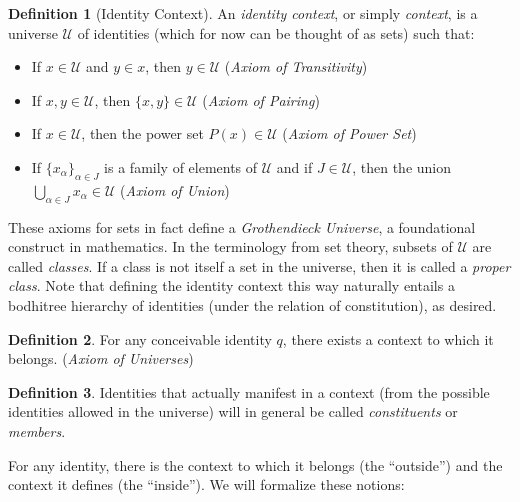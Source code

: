 \documentclass[pra,twocolumn,groupedaddress,10pt]{revtex4}
\theoremstyle{definition}
\newtheorem{defn}{Definition}[section]
\begin{document}
\begin{defn}[Identity Context]
	An \emph{identity context}, or simply \emph{context}, is a universe $\mathscr{U}$ of identities (which for now can be thought of as sets) such that:
	\begin{itemize}
		\item If $x \in \mathscr{U}$ and $y \in x$, then $y \in \mathscr{U}$ (\emph{Axiom of Transitivity})
		\item If $x, y \in \mathscr{U}$, then $\{x,y\} \in \mathscr{U}$ (\emph{Axiom of Pairing})
		\item If $x \in \mathscr{U}$, then the power set $P(x) \in \mathscr{U}$ (\emph{Axiom of Power Set})
		\item If $\{x_{\alpha}\}_{\alpha \in J}$ is a family of elements of $\mathscr{U}$ and if $J \in \mathscr{U}$, then the union $\bigcup_{\alpha \in J} x_{\alpha} \in \mathscr{U}$ (\emph{Axiom of Union})
	\end{itemize}
	These axioms for sets in fact define a \emph{Grothendieck Universe}\cite{grothendieck}\cite{foundcat}, a foundational construct in mathematics. In the terminology from set theory, subsets of $\mathscr{U}$ are called \emph{classes}. If a class is not itself a set in the universe, then it is called a \emph{proper class}.
	Note that defining the identity context this way naturally entails a bodhitree hierarchy of identities (under the relation of constitution), as desired.
\end{defn}

\begin{defn}
	For any conceivable identity $q$, there exists a context to which it belongs. (\emph{Axiom of Universes}\cite{maclane})
\end{defn}

\begin{defn}
	Identities that actually manifest in a context (from the possible identities allowed in the universe) will in general be called \emph{constituents} or \emph{members}.
\end{defn}

For any identity, there is the context to which it belongs (the ``outside'') and the context it defines (the ``inside''). We will formalize these notions:
\end{document}
